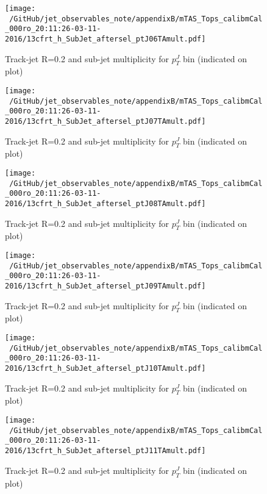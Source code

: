 \begin{figure}
 
\texttt{[image: ~/GitHub/jet\_observables\_note/appendixB/mTAS\_Tops\_calibmCal\_000ro\_20:11:26-03-11-2016/13cfrt\_h\_SubJet\_aftersel\_ptJ06TAmult.pdf]}
\caption{Track-jet R=0.2 and sub-jet multiplicity for $p_{T}^{J}$ bin (indicated on plot) }
 
\end{figure}
\begin{figure}
 
\texttt{[image: ~/GitHub/jet\_observables\_note/appendixB/mTAS\_Tops\_calibmCal\_000ro\_20:11:26-03-11-2016/13cfrt\_h\_SubJet\_aftersel\_ptJ07TAmult.pdf]}
\caption{Track-jet R=0.2 and sub-jet multiplicity for $p_{T}^{J}$ bin (indicated on plot) }
 
\end{figure}
 
\begin{figure}
 
\texttt{[image: ~/GitHub/jet\_observables\_note/appendixB/mTAS\_Tops\_calibmCal\_000ro\_20:11:26-03-11-2016/13cfrt\_h\_SubJet\_aftersel\_ptJ08TAmult.pdf]}
\caption{Track-jet R=0.2 and sub-jet multiplicity for $p_{T}^{J}$ bin (indicated on plot) }
 
\end{figure}

\begin{figure}

\texttt{[image: ~/GitHub/jet\_observables\_note/appendixB/mTAS\_Tops\_calibmCal\_000ro\_20:11:26-03-11-2016/13cfrt\_h\_SubJet\_aftersel\_ptJ09TAmult.pdf]}
\caption{Track-jet R=0.2 and sub-jet multiplicity for $p_{T}^{J}$ bin (indicated on plot) }
 
\end{figure}
 
\begin{figure}

\texttt{[image: ~/GitHub/jet\_observables\_note/appendixB/mTAS\_Tops\_calibmCal\_000ro\_20:11:26-03-11-2016/13cfrt\_h\_SubJet\_aftersel\_ptJ10TAmult.pdf]}
\caption{Track-jet R=0.2 and sub-jet multiplicity for $p_{T}^{J}$ bin (indicated on plot) }

\end{figure}

\begin{figure}

\texttt{[image: ~/GitHub/jet\_observables\_note/appendixB/mTAS\_Tops\_calibmCal\_000ro\_20:11:26-03-11-2016/13cfrt\_h\_SubJet\_aftersel\_ptJ11TAmult.pdf]}
\caption{Track-jet R=0.2 and sub-jet multiplicity for $p_{T}^{J}$ bin (indicated on plot) }

\end{figure}

